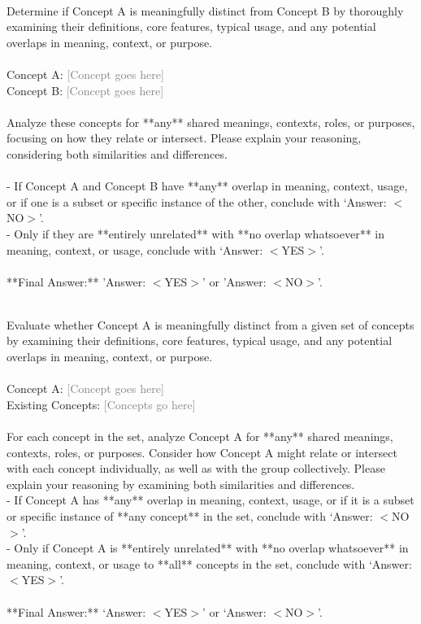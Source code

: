 \begin{tcolorbox}[title=Check whether two senses are different]
\quad \\
\small 
Determine if Concept A is meaningfully distinct from Concept B by thoroughly examining their definitions, core features, typical usage, and any potential overlaps in meaning, context, or purpose. \\ \\
Concept A: \textcolor{gray}{[Concept goes here]} \\
Concept B: \textcolor{gray}{[Concept goes here]} \\ \\
Analyze these concepts for **any** shared meanings, contexts, roles, or purposes, focusing on how they relate or intersect. Please explain your reasoning, considering both similarities and differences. \\ \\
- If Concept A and Concept B have **any** overlap in meaning, context, usage, or if one is a subset or specific instance of the other, conclude with `Answer: $<$NO$>$'. \\
- Only if they are **entirely unrelated** with **no overlap whatsoever** in meaning, context, or usage, conclude with `Answer: $<$YES$>$'. \\ \\ 
**Final Answer:** 'Answer: $<$YES$>$' or 'Answer: $<$NO$>$'.\\
\end{tcolorbox}

\clearpage

\begin{tcolorbox}[title=Check whether one sense is different from other concepts]
\quad \\
\small 
Evaluate whether Concept A is meaningfully distinct from a given set of concepts by examining their definitions, core features, typical usage, and any potential overlaps in meaning, context, or purpose. \\ \\
Concept A: \textcolor{gray}{[Concept goes here]} \\
Existing Concepts:
\textcolor{gray}{[Concepts go here]} \\ \\
For each concept in the set, analyze Concept A for **any** shared meanings, contexts, roles, or purposes. Consider how Concept A might relate or intersect with each concept individually, as well as with the group collectively. Please explain your reasoning by examining both similarities and differences. \\
- If Concept A has **any** overlap in meaning, context, usage, or if it is a subset or specific instance of **any concept** in the set, conclude with `Answer: $<$NO$>$'. \\
- Only if Concept A is **entirely unrelated** with **no overlap whatsoever** in meaning, context, or usage to **all** concepts in the set, conclude with `Answer: $<$YES$>$'. \\ \\
**Final Answer:** `Answer: $<$YES$>$' or `Answer: $<$NO$>$'.\\
\end{tcolorbox}

